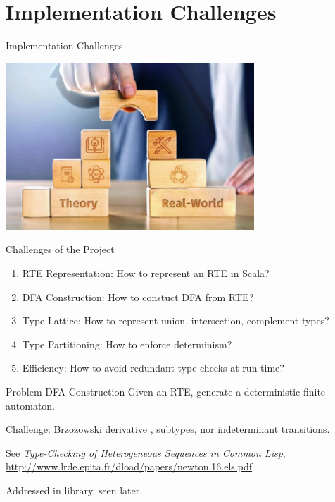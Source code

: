 \section{Implementation Challenges}

{  
  \begin{frame}{Implementation Challenges}
      
  \centering
  \includegraphics[width=0.7\textwidth]{theoretic-challenge.png}
\end{frame}
}

\begin{frame}{Challenges of the Project}
  \begin{enumerate}
  \item RTE Representation:   How to represent an RTE in Scala?
  \item DFA Construction:  How to constuct DFA from RTE?
  \item Type Lattice: How to represent union, intersection, complement types?
  \item Type Partitioning: How to enforce determinism?
  \item Efficiency:  How to avoid redundant type checks at run-time?
  \end{enumerate}
\end{frame}

\begin{frame}{Problem }{DFA Construction}
  Given an RTE, generate a deterministic finite automaton.

  \medskip
  
  Challenge: Brzozowski derivative , subtypes, nor indeterminant transitions.

  \medskip
  
  See \emph{Type-Checking of Heterogeneous Sequences in Common Lisp}, \url{http://www.lrde.epita.fr/dload/papers/newton.16.els.pdf}

  \medskip

  Addressed in  library, seen later.
\end{frame}

